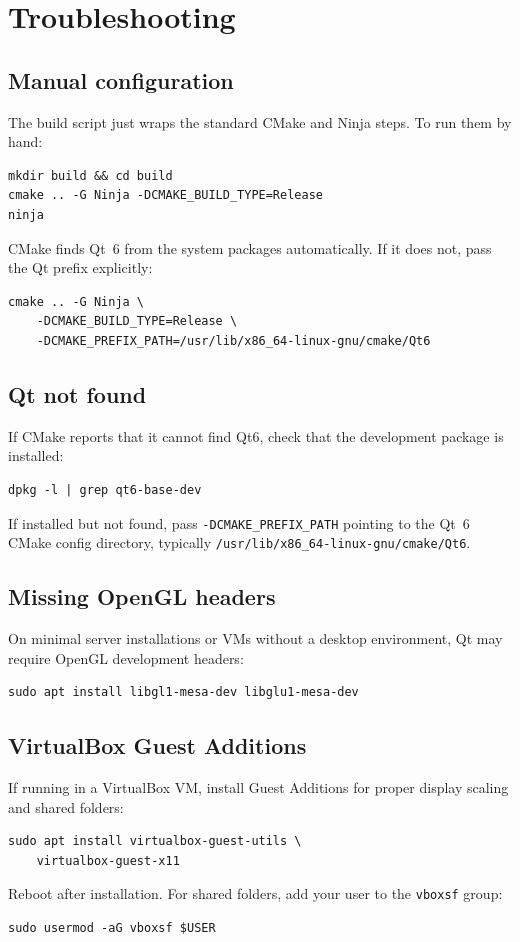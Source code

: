 \documentclass[11pt]{article}
\begin{document}
\section{Troubleshooting}

\subsection{Manual configuration}

The build script just wraps the standard CMake and Ninja steps.  To run
them by hand:
\begin{lstlisting}
mkdir build && cd build
cmake .. -G Ninja -DCMAKE_BUILD_TYPE=Release
ninja
\end{lstlisting}
CMake finds Qt~6 from the system packages automatically.  If it does
not, pass the Qt prefix explicitly:
\begin{lstlisting}
cmake .. -G Ninja \
    -DCMAKE_BUILD_TYPE=Release \
    -DCMAKE_PREFIX_PATH=/usr/lib/x86_64-linux-gnu/cmake/Qt6
\end{lstlisting}

\subsection{Qt not found}

If CMake reports that it cannot find Qt6, check that the development
package is installed:
\begin{lstlisting}
dpkg -l | grep qt6-base-dev
\end{lstlisting}
If installed but not found, pass \texttt{-DCMAKE\_PREFIX\_PATH} pointing
to the Qt~6 CMake config directory, typically
\texttt{/usr/lib/x86\_64-linux-gnu/cmake/Qt6}.

\subsection{Missing OpenGL headers}

On minimal server installations or VMs without a desktop environment,
Qt may require OpenGL development headers:
\begin{lstlisting}
sudo apt install libgl1-mesa-dev libglu1-mesa-dev
\end{lstlisting}

\subsection{VirtualBox Guest Additions}

If running in a VirtualBox VM, install Guest Additions for proper display
scaling and shared folders:
\begin{lstlisting}
sudo apt install virtualbox-guest-utils \
    virtualbox-guest-x11
\end{lstlisting}
Reboot after installation.  For shared folders, add your user to the
\texttt{vboxsf} group:
\begin{lstlisting}
sudo usermod -aG vboxsf $USER
\end{lstlisting}
\end{document}
